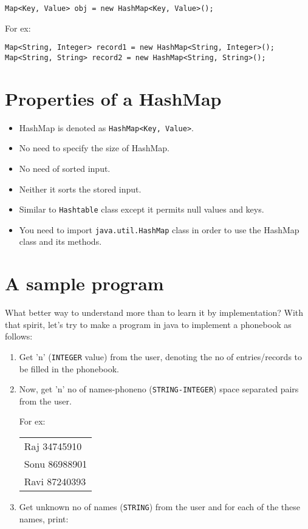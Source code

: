 \documentclass[11pt]{article}
\begin{document}
\begin{verbatim}
Map<Key, Value> obj = new HashMap<Key, Value>();
\end{verbatim}

For ex:

\begin{verbatim}
Map<String, Integer> record1 = new HashMap<String, Integer>();
Map<String, String> record2 = new HashMap<String, String>();
\end{verbatim}

\section{Properties of a HashMap}
\label{sec:orgfea3054}

\begin{itemize}
\item HashMap is denoted as \texttt{HashMap<Key, Value>}.
\item No need to specify the size of HashMap.
\item No need of sorted input.
\item Neither it sorts the stored input.
\item Similar to \texttt{Hashtable} class except it permits null values and keys.
\item You need to import \texttt{java.util.HashMap} class in order to use the HashMap class
and its methods.
\end{itemize}

\section{A sample program}
\label{sec:orgbb9058e}

What better way to understand more than to learn it by implementation? With that
spirit, let’s try to make a program in java to implement a phonebook
as follows:

\begin{enumerate}
\item Get ’n’ (\texttt{INTEGER} value) from the user, denoting the no of entries/records
to be filled in the phonebook.
\item Now, get ’n’ no of names-phoneno (\texttt{STRING-INTEGER}) space separated pairs from the user.

For ex:

\begin{center}
\begin{tabular}{l}
Raj 34745910\\
Sonu 86988901\\
Ravi 87240393\\
\end{tabular}
\end{center}

\item Get unknown no of names (\texttt{STRING}) from the user and for each of the these
names, print:
\end{enumerate}
\end{document}
